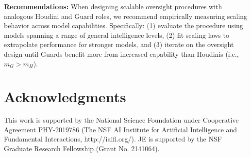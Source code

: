 \documentclass{article}
\begin{document}
\textbf{Recommendations:} When designing scalable oversight procedures with analogous Houdini and Guard roles, we recommend empirically measuring scaling behavior across model capabilities. Specifically: (1) evaluate the procedure using models spanning a range of general intelligence levels, (2) fit scaling laws to extrapolate performance for stronger models, and (3) iterate on the oversight design until Guards benefit more from increased capability than Houdinis (i.e., $m_G>m_H$).

\section*{Acknowledgments}
This work is supported by the National Science Foundation under Cooperative Agreement PHY-2019786 (The NSF AI Institute for Artificial Intelligence and Fundamental Interactions, http://iaifi.org/). JE is supported by the NSF Graduate
Research Fellowship (Grant No. 2141064).


\end{document}
